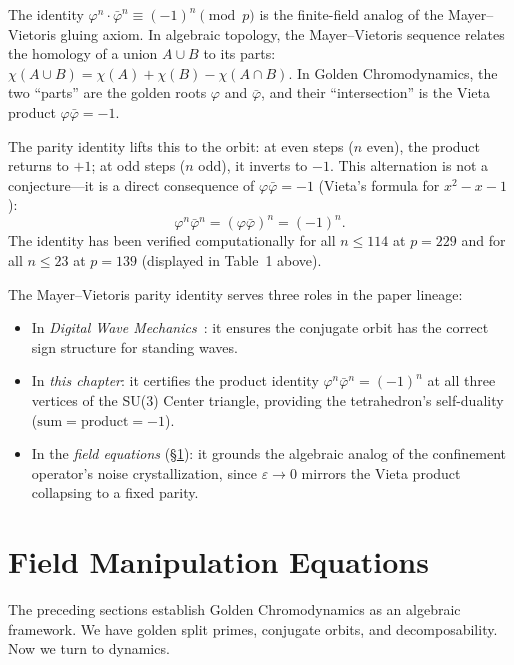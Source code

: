 \documentclass[12pt,oneside]{article}
\theoremstyle{principia}
\theoremstyle{definition}
\theoremstyle{remark}
\begin{document}
The identity $\varphi^n \cdot \bar\varphi^n \equiv (-1)^n \pmod{p}$
is the finite-field analog of the Mayer--Vietoris gluing axiom.
In algebraic topology, the Mayer--Vietoris sequence relates the
homology of a union $A \cup B$ to its parts:
$\chi(A \cup B) = \chi(A) + \chi(B) - \chi(A \cap B)$.
In Golden Chromodynamics, the two ``parts'' are the golden roots
$\varphi$ and $\bar\varphi$, and their ``intersection'' is the
Vieta product $\varphi \bar\varphi = -1$.

The parity identity lifts this to the orbit:
at even steps ($n$ even), the product returns to $+1$;
at odd steps ($n$ odd), it inverts to $-1$.
This alternation is not a conjecture---it is a direct consequence
of $\varphi \bar\varphi = -1$ (Vieta's formula for $x^2 - x - 1$):
\[
\varphi^n \bar\varphi^n = (\varphi \bar\varphi)^n = (-1)^n.
\]
The identity has been verified computationally for all $n \leq 114$
at $p = 229$ and for all $n \leq 23$ at $p = 139$
(displayed in Table~1 above).

The Mayer--Vietoris parity identity serves three roles in the
paper lineage:
\begin{itemize}
\item In \emph{Digital Wave Mechanics}~\cite{lockwood_larue_dwm, dwm}: it ensures the
  conjugate orbit has the correct sign structure for standing waves.
\item In \emph{this chapter}: it certifies the product identity
  $\varphi^n \bar\varphi^n = (-1)^n$ at all three vertices of the
  SU(3) Center triangle, providing the tetrahedron's
  self-duality ($\text{sum} = \text{product} = -1$).
\item In the \emph{field equations} (\S\ref{sec:field_equations}):
  it grounds the algebraic analog of the confinement operator's noise
  crystallization, since $\varepsilon \to 0$ mirrors the Vieta product
  collapsing to a fixed parity.
\end{itemize}

\section{Field Manipulation Equations}
\label{sec:field_equations}

The preceding sections establish Golden Chromodynamics as an algebraic framework. We have golden split primes, conjugate orbits, and decomposability. Now we turn to dynamics.
\end{document}
